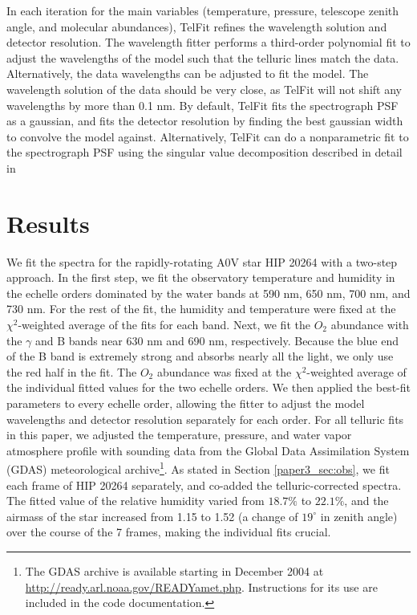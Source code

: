In each iteration for the main variables (temperature, pressure, telescope zenith angle, and molecular abundances), TelFit refines the wavelength solution and detector resolution. The wavelength fitter performs a third-order polynomial fit to adjust the wavelengths of the model such that the telluric lines match the data. Alternatively, the data wavelengths can be adjusted to fit the model. The wavelength solution of the data should be very close, as TelFit will not shift any wavelengths by more than 0.1 nm. By default, TelFit fits the spectrograph PSF as a gaussian, and fits the detector resolution by finding the best gaussian width to convolve the model against. Alternatively, TelFit can do a nonparametric fit to the spectrograph PSF using the singular value decomposition described in detail in \cite{Rucinski1999}


\section{Results}
\label{paper3_sec:results}

We fit the spectra for the rapidly-rotating A0V star HIP 20264 with a two-step approach. In the first step, we fit the observatory temperature and humidity in the echelle orders dominated by the water bands at 590 nm, 650 nm, 700 nm, and 730 nm. For the rest of the fit, the humidity and temperature were fixed at the $\chi^2$-weighted average of the fits for each band. Next, we fit the $O_2$ abundance with the $\gamma$ and B bands near 630 nm and 690 nm, respectively. Because the blue end of the B band is extremely strong and absorbs nearly all the light, we only use the red half in the fit. The $O_2$ abundance was fixed at the $\chi^2$-weighted average of the individual fitted values for the two echelle orders. We then applied the best-fit parameters to every echelle order, allowing the fitter to adjust the model wavelengths and detector resolution separately for each order. For all telluric fits in this paper, we adjusted the temperature, pressure, and water vapor atmosphere profile with sounding data from the Global Data Assimilation System (GDAS) meteorological archive\footnote{The GDAS archive is available starting in December 2004 at \url{http://ready.arl.noaa.gov/READYamet.php}. Instructions for its use are included in the code documentation.}. As stated in Section \ref{paper3_sec:obs}, we fit each frame of HIP 20264 separately, and co-added the telluric-corrected spectra. The fitted value of the relative humidity varied from $18.7\%$ to $22.1\%$, and the airmass of the star increased from 1.15 to 1.52 (a change of $19^{\circ}$ in zenith angle) over the course of the 7 frames, making the individual fits crucial.

